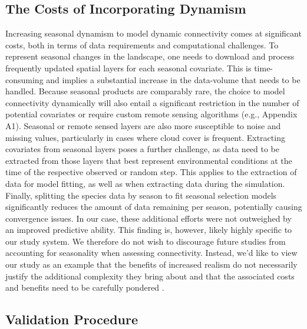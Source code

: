 \documentclass[abstract=on,10pt,a4paper,bibliography=totocnumbered]{article}
\begin{document}
\subsection{The Costs of Incorporating Dynamism}

Increasing seasonal dynamism to model dynamic connectivity comes at significant
costs, both in terms of data requirements and computational challenges. To
represent seasonal changes in the landscape, one needs to download and process
frequently updated spatial layers for each seasonal covariate. This is
time-consuming and implies a substantial increase in the data-volume that needs
to be handled. Because seasonal products are comparably rare, the choice to
model connectivity dynamically will also entail a significant restriction in the
number of potential covariates or require custom remote sensing algorithms
(e.g., Appendix A1). Seasonal or remote sensed layers are also more susceptible
to noise and missing values, particularly in cases where cloud cover is
frequent. Extracting covariates from seasonal layers poses a further challenge,
as data need to be extracted from those layers that best represent environmental
conditions at the time of the respective observed or random step. This applies
to the extraction of data for model fitting, as well as when extracting data
during the simulation. Finally, splitting the species data by season to fit
seasonal selection models significantly reduces the amount of data remaining per
season, potentially causing convergence issues. In our case, these additional
efforts were not outweighed by an improved predictive ability. This finding is,
however, likely highly specific to our study system. We therefore do not wish to
discourage future studies from accounting for seasonality when assessing
connectivity. Instead, we'd like to view our study as an example that the
benefits of increased realism do not necessarily justify the additional
complexity they bring about and that the associated costs and benefits need to
be carefully pondered \citep{Puy.2022}.

\subsection{Validation Procedure}
\end{document}
